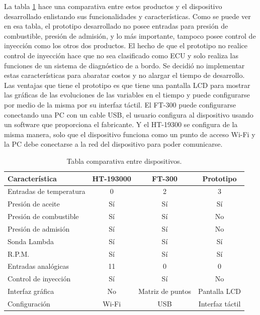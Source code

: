 La tabla \ref{tab:comparativa} hace una comparativa entre estos productos y el dispositivo desarrollado enlistando sus funcionalidades y características.  Como se puede ver en esa tabla, el prototipo desarrollado no posee entradas para presión de combustible, presión de admisión, y lo más importante, tampoco posee control de inyección como los otros dos productos. El hecho de que el prototipo no realice control de inyección hace que no sea clasificado como ECU y solo realiza las funciones de un sistema de diagnóstico de a bordo. Se decidió no implementar estas características para abaratar costos y no alargar el tiempo de desarrollo. Las ventajas que tiene el prototipo es que tiene una pantalla LCD para mostrar las gráficas de las evoluciones de las variables en el tiempo y puede configurarse por medio de la misma por su interfaz táctil. El FT-300 puede configurarse conectando una PC con un cable USB, el usuario configura al dispositivo usando un software que proporciona el fabricante. Y el HT-19300 se configura de la misma manera, solo que el dispositivo funciona como un punto de acceso Wi-Fi y la PC debe conectarse a la red del dispositivo para poder comunicarse.

\begin{table}[htpb]
	\centering
	\caption[Tabla comparativa entre dispositivos.]{Tabla comparativa entre dispositivos.}
	\centering
	\begin{tabular}{l c c c}    
		\toprule
		\textbf{Característica }     & \textbf{HT-193000} & \textbf{FT-300} & \textbf{Prototipo}\\
		\midrule
		Entradas de temperatura	&  0 &   2 &  3\\
		Presión de aceite		& Sí &  Sí & Sí\\
		Presión de combustible	& Sí &  Sí & No\\
		Presión de admisión		& Sí &  Sí & No\\
		Sonda Lambda			& Sí &  Sí & Sí\\
		R.P.M.					& Sí &  Sí & Sí\\
		Entradas analógicas		& 11 &  0  &  0\\
		Control de inyección	& Sí &  Sí & No\\
		Interfaz gráfica		& No &  Matriz de puntos & Pantalla LCD \\
		Configuración			& Wi-Fi & USB & Interfaz táctil \\ 
		\bottomrule
	\end{tabular}
	\label{tab:comparativa}
\end{table}